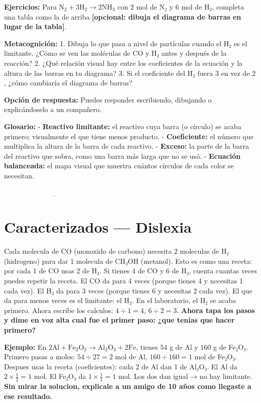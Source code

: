 \documentclass[
  spanish,
  letterpaper,
  12pt,
  oneside,
  open=any]{scrbook}
\newcommand{\setcolorsection}[2]{%
  \definecolor{currentsectionbg}{HTML}{#1}%
  \definecolor{currentsectionborder}{HTML}{#2}%
}
\begin{document}
\textbf{Ejercicios:} Para
\(\text{N}_2 + 3\text{H}_2 \rightarrow 2\text{NH}_3\) con \(2\) mol de
N₂ y \(6\) mol de H₂, completa una tabla como la de arriba
\textbf{{[}opcional: dibuja el diagrama de barras en lugar de la
tabla{]}}.

\textbf{Metacognición:} 1. Dibuja lo que pasa a nivel de partículas
cuando el H₂ es el limitante. ¿Cómo se ven las moléculas de CO y H₂
antes y después de la reacción? 2. ¿Qué relación visual hay entre los
coeficientes de la ecuación y la altura de las barras en tu diagrama? 3.
Si el coeficiente del H₂ fuera \(3\) en vez de \(2\), ¿cómo cambiaría el
diagrama de barras?

\textbf{Opción de respuesta:} Puedes responder escribiendo, dibujando o
explicándoselo a un compañero.

\textbf{Glosario:} - \textbf{Reactivo limitante:} el reactivo cuya barra
(o círculo) se acaba primero; visualmente el que tiene menos producto. -
\textbf{Coeficiente:} el número que multiplica la altura de la barra de
cada reactivo. - \textbf{Exceso:} la parte de la barra del reactivo que
sobra, como una barra más larga que no se usó. - \textbf{Ecuación
balanceada:} el mapa visual que muestra cuántos círculos de cada color
se necesitan.

\(\underline{\hspace{6cm}}\)

\setcolorsection{d6c7e7}{c0b0d8}

\section{Caracterizados --- Dislexia}\label{caracterizados-dislexia}

Cada molecula de CO (monoxido de carbono) necesita 2 moleculas de H₂
(hidrogeno) para dar 1 molecula de CH₃OH (metanol). Esto es como una
receta: por cada 1 de CO usas 2 de H₂. Si tienes 4 de CO y 6 de H₂,
cuenta cuantas veces puedes repetir la receta. El CO da para 4 veces
(porque tienes 4 y necesitas 1 cada vez). El H₂ da para 3 veces (porque
tienes 6 y necesitas 2 cada vez). El que da para menos veces es el
limitante: el H₂. En el laboratorio, el H₂ se acaba primero. Ahora
escribe los calculos: \(4 \div 1 = 4\), \(6 \div 2 = 3\). \textbf{Ahora
tapa los pasos y dime en voz alta cual fue el primer paso: ¿que tenias
que hacer primero?}

\textbf{Ejemplo:} En
\(2\text{Al} + \text{Fe}_2\text{O}_3 \rightarrow \text{Al}_2\text{O}_3 + 2\text{Fe}\),
tienes \(54\) g de Al y \(160\) g de Fe₂O₃. Primero pasas a moles:
\(54 \div 27 = 2\) mol de Al, \(160 \div 160 = 1\) mol de Fe₂O₃. Despues
usas la receta (coeficientes): cada 2 de Al dan 1 de Al₂O₃. El Al da
\(2 \times \frac{1}{2} = 1\) mol. El Fe₂O₃ da
\(1 \times \frac{1}{1} = 1\) mol. Los dos dan igual → no hay limitante.
\textbf{Sin mirar la solucion, explicale a un amigo de 10 años como
llegaste a ese resultado.}
\end{document}
